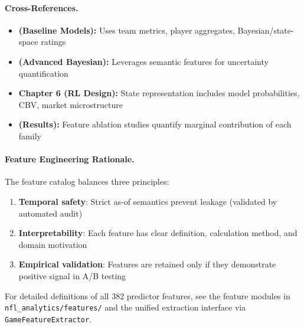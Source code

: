 \paragraph{Cross-References.}
\begin{itemize}
    \item \textbf{ (Baseline Models):} Uses team metrics, player aggregates, Bayesian/state-space ratings
    \item \textbf{ (Advanced Bayesian):} Leverages semantic features for uncertainty quantification
    \item \textbf{Chapter 6 (RL Design):} State representation includes model probabilities, CBV, market microstructure
    \item \textbf{ (Results):} Feature ablation studies quantify marginal contribution of each family
\end{itemize}

\paragraph{Feature Engineering Rationale.}
The feature catalog balances three principles:
\begin{enumerate}
    \item \textbf{Temporal safety}: Strict as-of semantics prevent leakage (validated by automated audit)
    \item \textbf{Interpretability}: Each feature has clear definition, calculation method, and domain motivation
    \item \textbf{Empirical validation}: Features are retained only if they demonstrate positive signal in A/B testing
\end{enumerate}

For detailed definitions of all 382 predictor features, see the feature modules in \texttt{nfl\_analytics/features/} and the unified extraction interface via \texttt{GameFeatureExtractor}.
